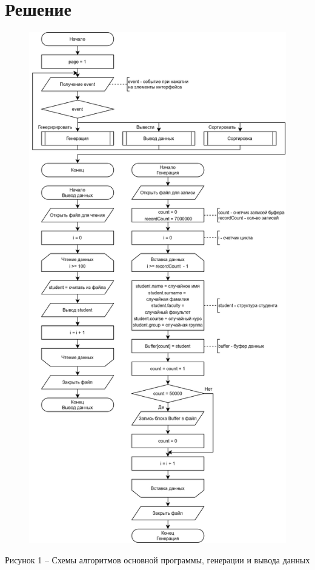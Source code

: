 \documentclass[a4paper,14pt]{extarticle}
\begin{document}
  \pagebreak
  \section*{Решение}

  \begin{figure}[h]
    \centering
    \includegraphics[width=0.592\linewidth]{images/s-1}
  \end{figure}
  \begin{center}
    Рисунок 1 – Схемы алгоритмов основной программы, генерации и вывода данных
  \end{center}

  \pagebreak
\end{document}
